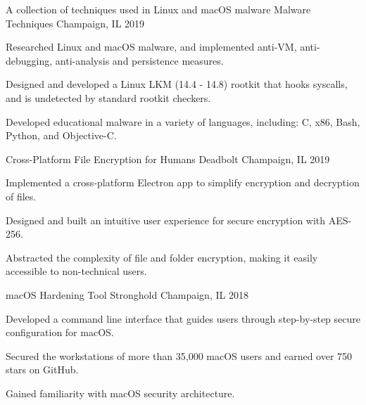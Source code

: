 
\begin{cventries}
\cventry
{A collection of techniques used in Linux and macOS malware} %
{Malware Techniques} %
{Champaign, IL} %
{2019} %
{
	\begin{cvitems} %
		\item {Researched Linux and macOS malware, and implemented anti-VM, anti-debugging, anti-analysis and persistence measures.}
		\item {Designed and developed a Linux LKM (14.4 - 14.8) rootkit that hooks syscalls, and is undetected by standard rootkit checkers.}
		\item {Developed educational malware in a variety of languages, including: C, x86, Bash, Python, and Objective-C.}
	\end{cvitems}
}

\cventry
{Cross-Platform File Encryption for Humans} %
{Deadbolt} %
{Champaign, IL} %
{2019} %
{
	\begin{cvitems} %
		\item {Implemented a cross-platform Electron app to simplify encryption and decryption of files.}
		\item {Designed and built an intuitive user experience for secure encryption with AES-256.}
		\item {Abstracted the complexity of file and folder encryption, making it easily accessible to non-technical users.}
	\end{cvitems}
}

\cventry
{macOS Hardening Tool} %
{Stronghold} %
{Champaign, IL} %
{2018} %
{
	\begin{cvitems} %
		\item {Developed a command line interface that guides users through step-by-step secure configuration for macOS.}
		\item {Secured the workstations of more than 35,000 macOS users and earned over 750 stars on GitHub.}
		\item {Gained familiarity with macOS security architecture.}
	\end{cvitems}
}


\end{cventries}
